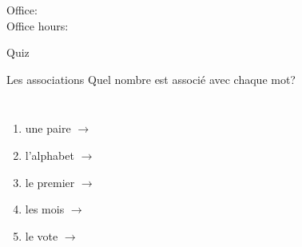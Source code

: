 \documentclass{beamer}
\subtitle[Dates]{Les dates importantes}
\begin{document}
  \begin{frame}
    \titlepage
    \tiny{Office: \\
          Office hours: }
  \end{frame}

  \begin{frame}{}
    \begin{center}
      \Large Quiz
    \end{center}
  \end{frame}

  \begin{frame}{Les associations}
    Quel nombre est associé avec chaque mot? \\
    \begin{columns}
        \begin{enumerate}
          \item une paire $\to$ \underline{}
          \item l'alphabet $\to$ \underline{}
          \item le premier $\to$ \underline{}
          \item les mois $\to$ \underline{}
          \item le vote $\to$ \underline{}
        \end{enumerate}
        \begin{minipage}[c][0.6\textheight]{\linewidth}
          \begin{center}
          \end{center}
        \end{minipage}
    \end{columns}
  \end{frame}
\end{document}
